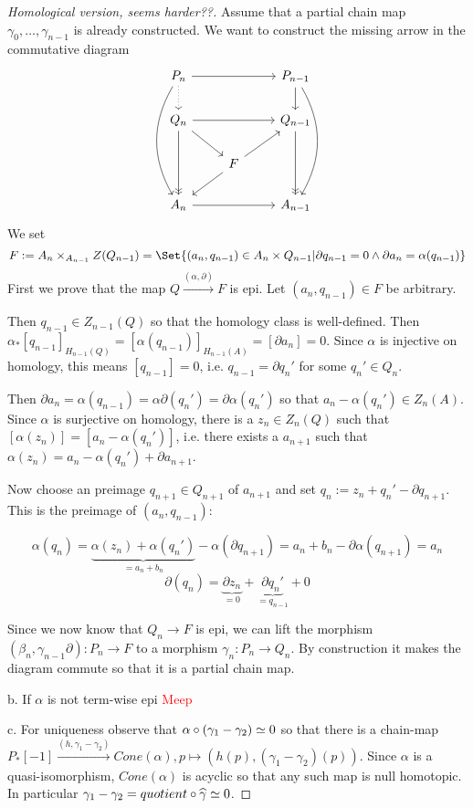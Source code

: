 \documentclass[fontsize=11pt,fleqn,a4paper]{scrartcl}
\begin{document}
\begin{proof}[Homological version, seems harder??]
Assume that a partial chain map $\gamma_0,\ldots,\gamma_{n-1}$ is already constructed. We want to construct the missing arrow in the commutative diagram
\[\begin{tikzcd}
P_n \ar[rr] \ar[d,dotted] \ar[ddd,bend right] && P_{n-1} \ar[d] \ar[ddd,bend left] \\
Q_n \ar[dd,->>] \ar[rr] \ar[rd] && Q_{n-1} \ar[dd,->>] \\
& F \ar[ru] \ar[ld] & \\
A_n \ar[rr] && A_{n-1}
\end{tikzcd}\]
We set
\[F:=A_n \times_{A_{n-1}} Z(Q_{n-1}) = \Set{(a_n,q_{n-1})\in A_n\times Q_{n-1} | \partial q_{n-1} = 0 \wedge \partial a_n = \alpha(q_{n-1})}\]
First we prove that the map $Q \xrightarrow{(\alpha,\partial)} F$ is epi. Let $(a_n,q_{n-1})\in F$ be arbitrary.

Then $q_{n-1} \in Z_{n-1}(Q)$ so that the homology class is well-defined. Then $\alpha_\ast [q_{n-1}]_{H_{n-1}(Q)} = [\alpha(q_{n-1})]_{H_{n-1}(A)} = [\partial a_n] = 0$. Since $\alpha$ is injective on homology, this means $[q_{n-1}] = 0$, i.e. $q_{n-1} = \partial q_n'$ for some $q_n'\in Q_n$.

Then $\partial a_n = \alpha(q_{n-1}) = \alpha\partial(q_n') = \partial \alpha(q_n')$ so that $a_n-\alpha(q_n')\in Z_n(A)$. Since $\alpha$ is surjective on homology, there is a $z_n\in Z_n(Q)$ such that $[\alpha(z_n)] = [a_n-\alpha(q_n')]$, i.e. there exists a $a_{n+1}$ such that $\alpha(z_n) = a_n - \alpha(q_n') + \partial a_{n+1}$.

Now choose an preimage $q_{n+1}\in Q_{n+1}$ of $a_{n+1}$ and set $q_n := z_n+q_n' - \partial q_{n+1}$. This is the preimage of $(a_n,q_{n-1})$:

\[\alpha(q_n) = \underbrace{\alpha(z_n)+\alpha(q_n')}_{=a_n+b_n} - \alpha(\partial q_{n+1}) = a_n + b_n - \partial\alpha(q_{n+1}) = a_n\]
\[\partial(q_n) = \underbrace{\partial z_n}_{=0} + \underbrace{\partial q_n'}_{=q_{n-1}} + 0\]

\medbreak
Since we now know that $Q_n \to F$ is epi, we can lift the morphism $(\beta_n,\gamma_{n-1}\partial): P_n \to F$ to a morphism $\gamma_n: P_n\to Q_n$. By construction it makes the diagram commute so that it is a partial chain map.

\medbreak
b. If $\alpha$ is not term-wise epi \textcolor{red}{Meep}

\medbreak
c. For uniqueness observe that $\alpha\circ(\gamma_1-\gamma_2) \simeq 0$ so that there is a chain-map $P_\ast[-1] \xrightarrow{(h,\gamma_1-\gamma_2)} Cone(\alpha), p \mapsto (h(p), (\gamma_1-\gamma_2)(p))$. Since $\alpha$ is a quasi-isomorphism, $Cone(\alpha)$ is acyclic so that any such map is null homotopic. In particular $\gamma_1-\gamma_2 = quotient\circ \widehat{\gamma} \simeq 0$.
\end{proof}
\end{document}
